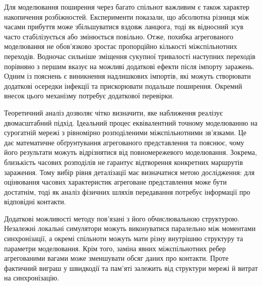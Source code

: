 Для моделювання поширення
через багато спільнот
важливим є також характер
накопичення розбіжностей.
Експерименти показали,
що абсолютна різниця
між часами прибуття може
збільшуватися вздовж ланцюга,
тоді як відносний зсув
часто стабілізується
або змінюється повільно.
Отже, похибка агрегованого
моделювання не обов'язково
зростає пропорційно
кількості міжспільнотних
переходів. Водночас
сильніше зміщення
сукупної тривалості
наступних переходів
порівняно з першим
вказує на можливі
додаткові ефекти
після імпорту заражень.
Одним із пояснень
є виникнення надлишкових
імпортів, які можуть
створювати додаткові
осередки інфекції
та прискорювати
подальше поширення.
Окремий внесок цього
механізму потребує
додаткової перевірки.

Теоретичний аналіз
дозволяє чітко визначити,
яке наближення реалізує
двомасштабний підхід.
Ідеальний процес
еквівалентний точному
моделюванню на сурогатній
мережі з рівномірно
розподіленими
міжспільнотними зв'язками.
Це дає математичне
обґрунтування агрегованого
представлення та пояснює,
чому його результати
можуть відрізнятися
від повномережевого
моделювання.
Зокрема, близькість
часових розподілів
не гарантує відтворення
конкретних маршрутів
зараження. Тому вибір
рівня деталізації
має визначатися
метою дослідження:
для оцінювання часових
характеристик агреговане
представлення може бути
достатнім, тоді як
аналіз фізичних шляхів
передавання потребує
інформації про відповідні
контакти.

Додаткові можливості
методу пов'язані
з його обчислювальною
структурою. Незалежні
локальні симулятори
можуть виконуватися
паралельно між моментами
синхронізації, а окремі
спільноти можуть мати
різну внутрішню структуру
та параметри моделювання.
Крім того, заміна
явних міжспільнотних
ребер агрегованими вагами
може зменшувати обсяг
даних про контакти.
Проте фактичний виграш
у швидкодії та пам'яті
залежить від структури
мережі й витрат на
синхронізацію.










